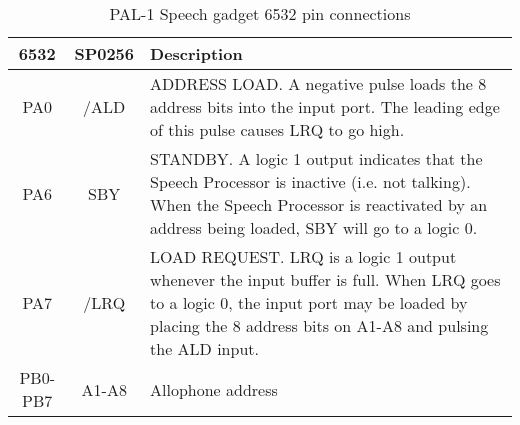 \begin{table}[h!]
	\centering
	\sffamily
	\renewcommand{\arraystretch}{1.25}
	\begin{tabular}{|c|c|p{10cm}|@{}}
		\rowcolor{gray!20}
		\hline
		\textbf{6532} & \textbf{SP0256} & \textbf{Description} \\
		\hline
		PA0 & /ALD & ADDRESS LOAD. A negative pulse loads the 8 address bits into the input port. The leading edge of this pulse causes LRQ to go high. \\
		PA6 & SBY & STANDBY. A logic 1 output indicates that the Speech Processor is inactive (i.e. not talking). When the Speech Processor is reactivated by an address being loaded, SBY will go to a logic 0. \\
		PA7 & /LRQ & LOAD REQUEST. LRQ is a logic 1 output whenever the input buffer is full. When LRQ goes to a logic 0, the input port may be loaded by placing the 8 address bits on A1-A8 and pulsing the ALD input. \\
		\hdashline
		PB0-PB7 & A1-A8 & Allophone address \\
		\hline
	\end{tabular}
	\caption{PAL-1 Speech gadget 6532 pin connections}
	\label{tab:speechif}
\end{table}